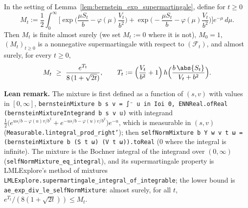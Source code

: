 \begin{lemma}\label{lem:pconc_bernstein_mixture}
\leanok
In the setting of Lemma~\ref{lem:bernstein_exp_supermartingale}, define for $t \ge 0$
\[
  M_t := \frac12 \int_0^\infty \Big[ \exp\Big(\frac{\mu S_t}{b} - \varphi(\mu)\frac{V_t}{b^2}\Big) + \exp\Big(-\frac{\mu S_t}{b} - \varphi(\mu)\frac{V_t}{b^2}\Big) \Big] e^{-\mu}\, d\mu .
\]
Then $M_t$ is finite almost surely (we set $M_t := 0$ where it is not), $M_0 = 1$, $(M_t)_{t \ge 0}$ is
a nonnegative supermartingale with respect to $(\mathcal F_t)$, and almost surely, for every $t \ge 0$,
\[
  M_t \ \ge\ \frac{e^{T_t}}{8\,(1 + \sqrt{2t})}, \qquad
  T_t := \Big(\frac{V_t}{b^2} + 1\Big)\, h\Big(\frac{b\, \abs{S_t}}{V_t + b^2}\Big) .
\]
\end{lemma}

\textbf{Lean remark.} The mixture is first defined as a function of $(s, v)$ with values in
$[0, \infty]$, \texttt{bernsteinMixture b s v = ∫⁻ u in Ioi 0, ENNReal.ofReal
(bernsteinMixtureIntegrand b s v u)} with integrand
$\frac12\big(e^{us/b - \varphi(u)v/b^2} + e^{-us/b - \varphi(u)v/b^2}\big)e^{-u}$, which is measurable
in $(s, v)$ (\texttt{Measurable.lintegral\_prod\_right'}); then
\texttt{selfNormMixture b Y w v t ω = (bernsteinMixture b (S t ω) (V t ω)).toReal} ($0$ where the
integral is infinite). The mixture is the Bochner integral of the integrand over $(0, \infty)$
(\texttt{selfNormMixture\_eq\_integral}), and its supermartingale property is LMLExplore's method of
mixtures \texttt{LMLExplore.supermartingale\_integral\_of\_integrable}; the lower bound is
\texttt{ae\_exp\_div\_le\_selfNormMixture}: almost surely, for all $t$,
$e^{T_t}/(8(1 + \sqrt{2t})) \le M_t$.

